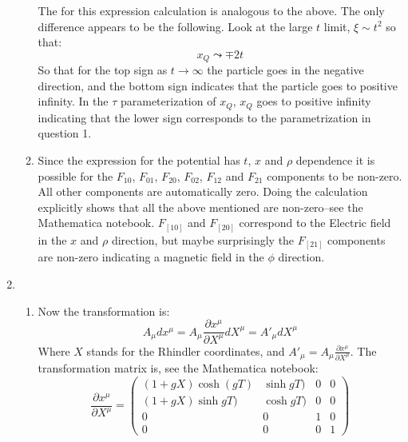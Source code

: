 \documentclass[12pt,a4]{article}
\begin{document}
\begin{enumerate}
\begin{enumerate}
\begin{equation*}
        \end{equation*}
        The for this expression calculation is analogous to the above.
        The only difference appears to be the following.
        Look at the large $t$ limit, $\xi \sim t^2$ so that:
        \begin{equation*}
          x_Q \leadsto \mp 2 t
        \end{equation*}
        So that for the top sign as $t \to \infty$ the particle goes in the negative direction, and the bottom sign indicates that the particle goes to positive infinity.
        In the $\tau$ parameterization of $x_Q$, $x_Q$ goes to positive infinity indicating that the lower sign corresponds to the parametrization in question 1.
      \item
        Since the expression for the potential has $t$, $x$ and $\rho$ dependence it is possible for the $F_{10}$, $F_{01}$, $F_{20}$, $F_{02}$, $F_{12}$ and $F_{21}$ components to be non-zero.
        All other components are automatically zero.
        Doing the calculation explicitly shows that all the above mentioned are non-zero--see the Mathematica notebook.
        $F_{[10]}$ and $F_{[20]}$ correspond to the Electric field in the $x$ and $\rho$ direction, but maybe surprisingly the $F_{[21]}$ components are non-zero indicating a magnetic field in the $\phi$ direction.
    \end{enumerate}
  \item
    \begin{enumerate}
      \item
        Now the transformation is:
        \begin{equation*}
          A_\mu dx^\mu = A_\mu \frac{\partial x^\mu}{\partial X^\mu} dX^\mu = A'_\mu dX^\mu
        \end{equation*}
        Where $X$ stands for the Rhindler coordinates, and $A'_\mu = A_\mu \frac{\partial x^\mu}{\partial X^\mu}$.
        The transformation matrix is, see the Mathematica notebook:
        \begin{equation*}
          \frac{\partial x^\mu}{\partial X^\mu}
          =
          \left(
          \begin{matrix*}
            (1+g X) \cosh(g T)&\sinh g T)&0&0\\
            (1+g X) \sinh g T)&\cosh g T)&0&0\\
            0&0&1&0\\
            0&0&0&1
          \end{matrix*}
          \right)
        \end{equation*}

\end{enumerate}
\end{enumerate}
\end{document}
